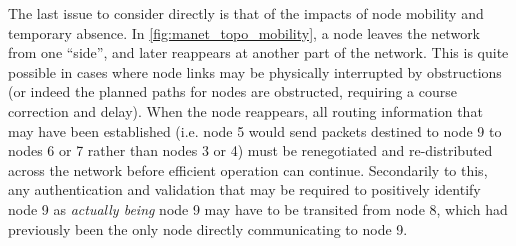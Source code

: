 The last issue to consider directly is that of the impacts of node mobility and temporary absence.
In \autoref{fig:manet_topo_mobility}, a node leaves the network from one ``side'', and later reappears at another part of the network.
This is quite possible in cases where node links may be physically interrupted by obstructions (or indeed the planned paths for nodes are obstructed, requiring a course correction and delay).
When the node reappears, all routing information that may have been established (i.e. node 5 would send packets destined to node 9 to nodes 6 or 7 rather than nodes 3 or 4) must be renegotiated and re-distributed across the network before efficient operation can continue.
Secondarily to this, any authentication and validation that may be required to positively identify node 9 as \emph{actually being} node 9 may have to be transited from node 8, which had previously been the only node directly communicating to node 9.


